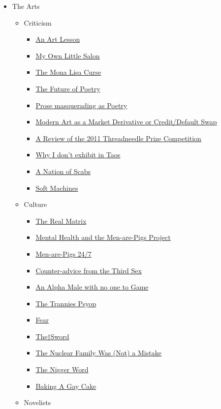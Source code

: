 \documentclass{article}
\newcommand{\insertmydocument}[2]{ %
  \item \href{http://www.mileswmathis.com/#2}{#1}
}
\begin{document}
\begin{itemize}
  \item The Arts
  \begin{itemize}

    \item Criticism
    \begin{itemize}

      \insertmydocument{An Art Lesson}{lesson.pdf}
      \insertmydocument{My Own Little Salon}{good.pdf}
      \insertmydocument{The Mona Lisa Curse}{hughes2.pdf}
      \insertmydocument{The Future of Poetry}{poetry.pdf}
      \insertmydocument{Prose masquerading as Poetry}{poetry2.pdf}
      \insertmydocument{Modern Art as a Market Derivative or Credit/Default Swap}{psycho.pdf}
      \insertmydocument{A Review of the 2011 Threadneedle Prize Competition}{thread.pdf}
      \insertmydocument{Why I don't exhibit in Taos}{tfaf.pdf}
      \insertmydocument{A Nation of Scabs}{scab.pdf}
      \insertmydocument{Soft Machines}{pace.pdf}
    \end{itemize}

    \item Culture
    \begin{itemize}

      \insertmydocument{The Real Matrix}{matrix.pdf}
      \insertmydocument{Mental Health and the Men-are-Pigs Project}{crazy.pdf}
      \insertmydocument{Men-are-Pigs 24/7}{ratass.pdf}
      \insertmydocument{Counter-advice from the Third Sex}{block.pdf}
      \insertmydocument{An Alpha Male with no one to Game}{redpill.pdf}
      \insertmydocument{The Trannies Psyop}{tran.pdf}
      \insertmydocument{Fear}{fear.pdf}
      \insertmydocument{The†Sword}{harpy.pdf}
      \insertmydocument{The Nuclear Family Was (Not) a Mistake}{family.pdf}
      \insertmydocument{The Nigger Word}{nigger.pdf}
      \insertmydocument{Baking A Gay Cake}{cake.pdf}

    \end{itemize}

    \item Novelists
    \begin{itemize}


\end{itemize}
\end{itemize}
\end{itemize}
\end{document}
